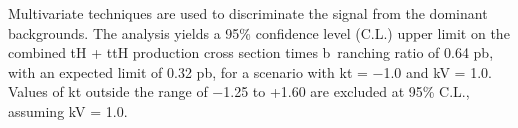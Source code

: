 Multivariate techniques are used to discriminate the signal from the dominant backgrounds. The analysis yields a 95\% confidence level (C.L.) upper limit on the combined tH + ttH production cross section times b\
ranching ratio of 0.64 pb, with an expected limit of 0.32 pb, for a scenario with kt = −1.0 and kV = 1.0. Values of kt outside the range of −1.25 to +1.60 are excluded at 95\% C.L., assuming kV = 1.0.











